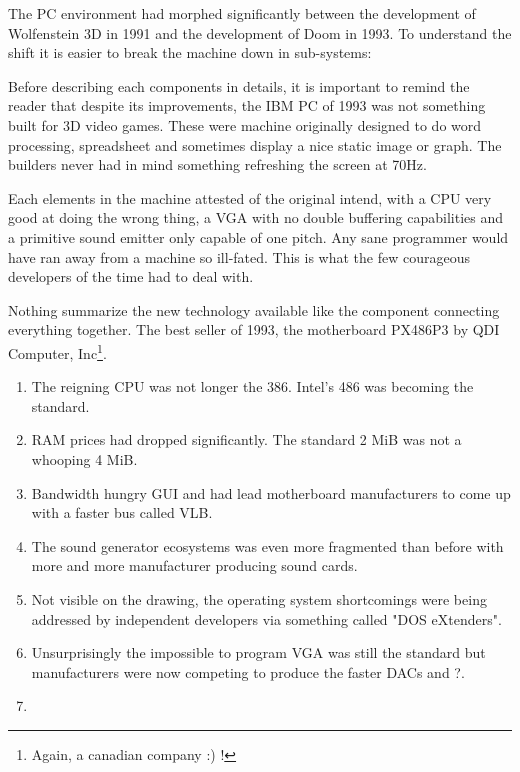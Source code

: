 The PC environment had morphed significantly between the development of Wolfenstein 3D in 1991 and the development of Doom in 1993. To understand the shift it is easier to break the machine down in sub-systems:\\
\par
{}
\par
Before describing each components in details, it is important to remind the reader that despite its improvements, the IBM PC of 1993 was not something built for 3D video games. These were machine originally designed to do word processing, spreadsheet and sometimes display a nice static image or graph. The builders never had in mind something refreshing the screen at 70Hz.\\
\par Each elements in the machine attested of the original intend, with a CPU very good at doing the wrong thing, a VGA with no double buffering capabilities and a primitive sound emitter only capable of one pitch. Any sane programmer would have ran away from a machine so ill-fated. This is what the few courageous developers of the time had to deal with.\\
\par
Nothing summarize the new technology available like the component connecting everything together. The best seller of 1993, the motherboard PX486P3 by QDI Computer, Inc\footnote{Again, a canadian company :) !}.\\
\par

\par
{}
\begin{enumerate}
\item The reigning CPU was not longer the 386. Intel's 486 was becoming the standard.
\item RAM prices had dropped significantly. The standard 2 MiB was not a whooping 4 MiB. 
\item Bandwidth hungry GUI and had lead motherboard manufacturers to come up with a faster bus called VLB.
\item The sound generator ecosystems was even more fragmented than before with more and more manufacturer producing sound cards.
\item Not visible on the drawing, the operating system shortcomings were being addressed by independent developers via something called "DOS eXtenders".
\item Unsurprisingly the impossible to program VGA was still the standard but manufacturers were now competing to produce the faster DACs and ?.
\item 
\end{enumerate}

